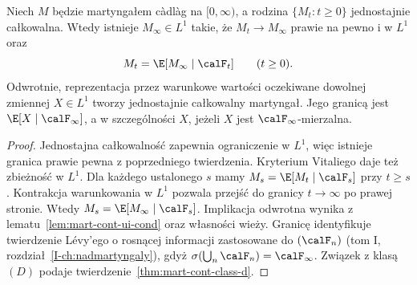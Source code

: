 \begin{twierdzenie}
\label{thm:mart-cont-ui-convergence}
Niech $M$ będzie martyngałem c\`adl\`ag na
$[0,\infty)$, a rodzina $\{M_t:t\ge0\}$
jednostajnie całkowalna. Wtedy istnieje
$M_\infty\in L^1$ takie, że $M_t\to M_\infty$
prawie na pewno i w $L^1$ oraz
\[
M_t=\E[M_\infty\mid\calF_t]
\qquad (t\ge0).
\]
Odwrotnie, reprezentacja przez warunkowe wartości
oczekiwane dowolnej zmiennej $X\in L^1$
tworzy jednostajnie całkowalny martyngał.
Jego granicą jest $\E[X\mid\calF_\infty]$,
a w szczególności $X$, jeżeli $X$ jest
$\calF_\infty$-mierzalna.
\end{twierdzenie}
\begin{proof}
Jednostajna całkowalność zapewnia ograniczenie w $L^1$,
więc istnieje granica prawie pewna z poprzedniego
twierdzenia. Kryterium Vitaliego daje też zbieżność
w $L^1$. Dla każdego ustalonego $s$ mamy
$M_s=\E[M_t\mid\calF_s]$ przy $t\ge s$.
Kontrakcja warunkowania w $L^1$ pozwala przejść
do granicy $t\to\infty$ po prawej stronie.
Wtedy $M_s=\E[M_\infty\mid\calF_s]$.
Implikacja odwrotna wynika z lematu~\ref{lem:mart-cont-ui-cond}
oraz własności wieży. Granicę identyfikuje twierdzenie
Lévy'ego o rosnącej informacji zastosowane do
$(\calF_n)$ (tom I, rozdział~\ref{I-ch:nadmartyngaly}),
gdyż $\sigma(\bigcup_n\calF_n)=\calF_\infty$.
Związek z klasą $(D)$ podaje
twierdzenie~\ref{thm:mart-cont-class-d}.
\end{proof}

